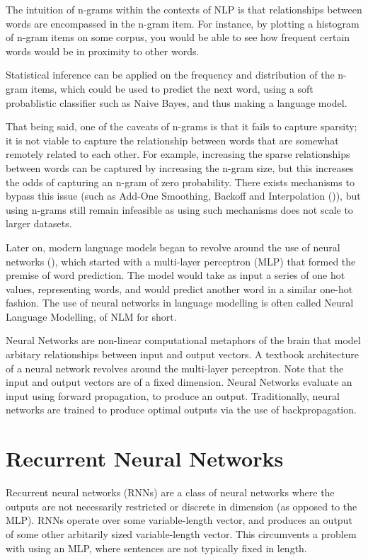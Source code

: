 \documentclass[12pt,twoside]{report}
\begin{document}
The intuition of n-grams within the contexts of NLP is that relationships between words are encompassed in the n-gram item. For instance, by plotting a histogram of n-gram items on some corpus, you would be able to see how frequent certain words would be in proximity to other words.

Statistical inference can be applied on the frequency and distribution of the n-gram items, which could be used to predict the next word, using a soft probablistic classifier such as Naive Bayes, and thus making a language model. 

That being said, one of the caveats of n-grams is that it fails to capture sparsity; it is not viable to capture the relationship between words that are somewhat remotely related to each other. For example, increasing the sparse relationships between words can be captured by increasing the n-gram size, but this increases the odds of capturing an n-gram of zero probability. There exists mechanisms to bypass this issue (such as Add-One Smoothing, Backoff and Interpolation (\cite{jurafsky_speech_2019})), but using n-grams still remain infeasible as using such mechanisms does not scale to larger datasets.

Later on, modern language models began to revolve around the use of neural networks (\cite{bengio_neural_2001}), which started with a multi-layer perceptron (MLP) that formed the premise of word prediction. The model would take as input a series of one hot values, representing words, and would predict another word in a similar one-hot fashion. The use of neural networks in language modelling is often called Neural Language Modelling, of NLM for short.

Neural Networks are non-linear computational metaphors of the brain that model arbitary relationships between input and output vectors. A textbook architecture of a neural network revolves around the multi-layer perceptron. Note that the input and output vectors are of a fixed dimension. Neural Networks evaluate an input using forward propagation, to produce an output. Traditionally, neural networks are trained to produce optimal outputs via the use of backpropagation. 

\section{Recurrent Neural Networks}
\label{rnn}

Recurrent neural networks (RNNs) are a class of neural networks where the outputs are not necessarily restricted or discrete in dimension (as opposed to the MLP). RNNs operate over some variable-length vector, and produces an output of some other arbitarily sized variable-length vector. This circumvents a problem with using an MLP, where sentences are not typically fixed in length. 
\end{document}
